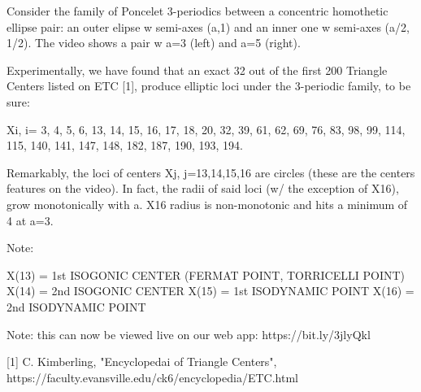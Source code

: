 Consider the family of Poncelet 3-periodics between a concentric homothetic ellipse pair: an outer elipse w semi-axes (a,1) and an inner one w semi-axes (a/2, 1/2). The video shows a pair w a=3 (left) and a=5 (right).

Experimentally, we have found that an exact 32 out of the first 200 Triangle Centers listed on ETC [1], produce elliptic loci under the 3-periodic family, to be sure:

Xi, i= 3, 4, 5, 6, 13, 14, 15, 16, 17, 18, 20, 32, 39, 61, 62, 69, 76, 83, 98, 99, 114, 115, 140, 141, 147, 148, 182, 187, 190, 193, 194.

Remarkably, the loci of centers Xj, j=13,14,15,16 are circles (these are the centers features on the video). In fact, the radii of said loci (w/ the exception of X16), grow monotonically with a. X16 radius is non-monotonic and hits a minimum of 4 at a=3.

Note:

X(13) = 1st ISOGONIC CENTER (FERMAT POINT, TORRICELLI POINT)
X(14) = 2nd ISOGONIC CENTER
X(15) = 1st ISODYNAMIC POINT
X(16) = 2nd ISODYNAMIC POINT

Note: this can now be viewed live on our web app: https://bit.ly/3jlyQkl

[1] C. Kimberling, "Encyclopedai of Triangle Centers", https://faculty.evansville.edu/ck6/encyclopedia/ETC.html